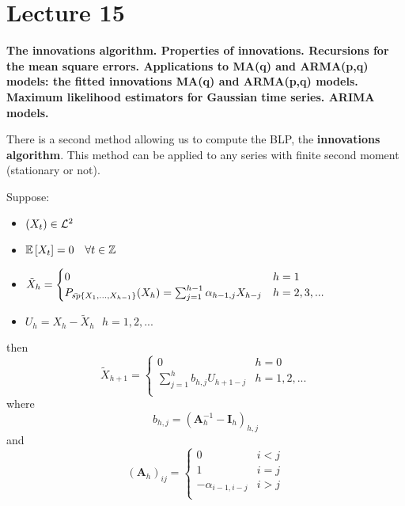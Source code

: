 \section{Lecture 15}
\label{lecture15}

\begin{center}
    \textbf{The innovations algorithm. Properties of innovations. Recursions for the mean square errors.  Applications to MA(q) and ARMA(p,q) models: the fitted innovations MA(q) and ARMA(p,q) models. Maximum likelihood estimators for Gaussian time series. ARIMA models.}
\end{center}

There is a second method allowing us to compute the BLP, the \textbf{innovations algorithm}. This method can be applied to any series with finite second moment (stationary or not).

\begin{proposition}
    Suppose:
    \begin{itemize}
        \item $(X_t)\in\mathcal{L}^{2}$
        \item $\mathbb{E}\left[X_t\right]=0\ \ \ \forall t\in\mathbb{Z}$
        \item $\tilde{X}_h=
        \begin{cases}
            0&h=1\\
            P_{\bar{sp}\left\{X_1,...,X_{h-1}\right\}}(X_h)=\sum_{j=1}^{h-1}\alpha_{h-1,j}X_{h-j}&h=2,3,...\\
        \end{cases}$
        \item $U_h=X_h-\tilde{X}_h\ \ \ h=1,2,...$
    \end{itemize}
    then
    \[
        \tilde{X}_{h+1}=
        \begin{cases}
            0&h=0\\
            \sum_{j=1}^hb_{h,j}U_{h+1-j}&h=1,2,...\\
        \end{cases}  
    \]
    where
    \[
        b_{h,j}=\left(\boldsymbol{A}_h^{-1}-\boldsymbol{I}_h\right)_{h,j}  
    \]
    and
    \[
        \left(\boldsymbol{A}_h\right)_{ij}=
        \begin{cases}
            0&i<j\\
            1&i=j\\
            -\alpha_{i-1,i-j}&i>j\\
        \end{cases}  
    \]
\end{proposition}


